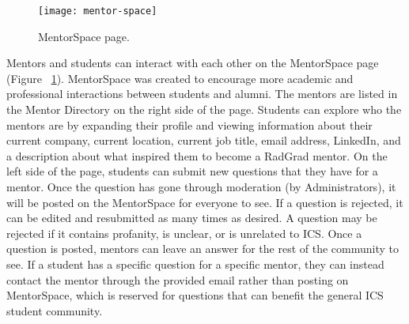 \begin{figure}[htbp!]
\centering
\texttt{[image: mentor-space]}
\caption{MentorSpace page.}
\label{mentorspace}
\end{figure}
Mentors and students can interact with each other on the MentorSpace page (Figure ~\ref{mentorspace}). MentorSpace was created to encourage more academic and professional interactions between students and alumni. The mentors are listed in the Mentor Directory on the right side of the page. Students can explore who the mentors are by expanding their profile and viewing information about their current company, current location, current job title, email address, LinkedIn, and a description about what inspired them to become a RadGrad mentor. On the left side of the page, students can submit new questions that they have for a mentor. Once the question has gone through moderation (by  Administrators), it will be posted on the MentorSpace for everyone to see. If a question is rejected, it can be edited and resubmitted as many times as desired. A question may be rejected if it contains profanity, is unclear, or is unrelated to ICS. Once a question is posted, mentors can leave an answer for the rest of the community to see. If a student has a specific question for a specific mentor, they can instead contact the mentor through the provided email rather than posting on MentorSpace, which is reserved for questions that can benefit the general ICS student community. 

